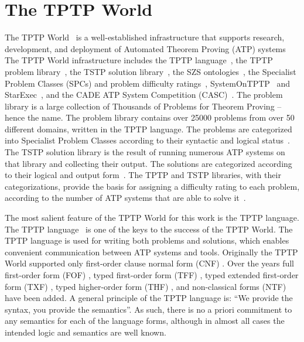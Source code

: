 \documentclass[runningheads]{llncs}
\begin{document}
\section{The TPTP World}
\label{TPTP}


The TPTP World~\cite{Sut24} is a well-established infrastructure that supports research, 
development, and deployment of Automated Theorem Proving (ATP) systems %
The TPTP World infrastructure includes
the TPTP language~\cite{SS+06},
the TPTP problem library~\cite{Sut09},
the TSTP solution library~\cite{Sut10},
the SZS ontologies~\cite{Sut08-KEAPPA},
the Specialist Problem Classes (SPCs) and problem difficulty ratings~\cite{SS01},
SystemOnTPTP~\cite{Sut00-CADE-17} and StarExec~\cite{SST14},
and the CADE ATP System Competition (CASC)~\cite{Sut16}.
The problem library is a large collection of Thousands of Problems for Theorem Proving -- hence 
the name. 
The problem library contains over 25000 problems from over 50 different domains, written in the 
TPTP language.
The problems are categorized into Specialist Problem Classes according to their syntactic and
logical status~\cite{Sut08-KEAPPA}.
The TSTP solution library is the result of running numerous ATP systems on that library and 
collecting their output. 
The solutions are categorized according to their logical and output form~\cite{Sut08-KEAPPA}.
The TPTP and TSTP libraries, with their categorizations, provide the basis for assigning a difficulty 
rating to each problem, according to the number of ATP systems that are able to solve 
it~\cite{SS01}.

The most salient feature of the TPTP World for this work is the TPTP language.
The TPTP language~\cite{Sut23-IGPL} is one of the keys to the success of the TPTP World.
The TPTP language is used for writing both problems and solutions,
which enables convenient communication between ATP systems and tools.
Originally the TPTP World supported only first-order clause normal form (CNF)
\cite{SS98-JAR}.
Over the years full first-order form (FOF)
\cite{Sut09}, 
typed first-order form (TFF)
\cite{SS+12,BP13-TFF1}, 
typed extended first-order form (TXF)
\cite{SK18}, 
typed higher-order form (THF)
\cite{SB10,KSR16}, 
and non-classical forms (NTF)~\cite{SF+22} have been added.
A general principle of the TPTP language is: ``We provide the syntax, you provide the semantics''.
As such, there is no a priori commitment to any semantics for each of the language forms, 
although in almost all cases the intended logic and semantics are well known.
\end{document}
